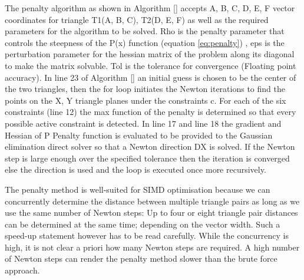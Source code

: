 The penalty algorithm as shown in Algorithm \ref{} accepts A, B, C, D, E, F vector coordinates for triangle T1(A, B, C), T2(D, E, F) as well as the required parameters for the algorithm to be solved. Rho is the penalty parameter that controls the steepness of the P(x) function (equation \ref{eq:penalty}) , eps is the perturbation parameter for the hessian matrix of the problem along its diagonal to make the matrix solvable. Tol is the tolerance for convergence (Floating point accuracy). In line 23 of Algorithm \ref{} an initial guess is chosen to be the center of the two triangles, then the for loop initiates the Newton iterations to find the points on the X, Y triangle planes under the constraints c. For each of the six constraints (line 12) the max function of the penalty is determined so that every possible active constraint is detected. In line 17 and line 18 the gradient and Hessian of P Penalty function is evaluated to be provided to the Gaussian elimination direct solver so that a Newton direction DX is solved. If the Newton step is large enough over the specified tolerance then the iteration is converged else the direction is used and the loop is executed once more recursively.

The penalty method is well-suited for SIMD optimisation because we can concurrently determine the distance between multiple triangle pairs as long as we use the same number of Newton steps: Up to four or eight
triangle pair distances can be determined at the same time; depending on the vector width. Such a speed-up statement however has to be read carefully. While the concurrency is high, it is not clear a priori how many Newton steps are required. A high number of Newton steps can render the penalty method slower than the brute force approach.